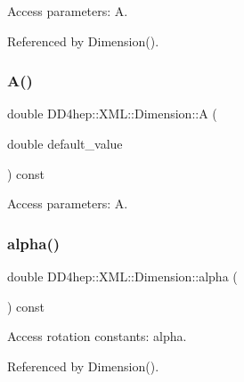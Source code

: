 Access parameters\+: A. 



Referenced by Dimension().

\hypertarget{struct_d_d4hep_1_1_x_m_l_1_1_dimension_a9117763ec12e9a29318293c24926f0f0}{}\label{struct_d_d4hep_1_1_x_m_l_1_1_dimension_a9117763ec12e9a29318293c24926f0f0} 
\subsubsection{\texorpdfstring{A()}{A()}\hspace{0.1cm}{\footnotesize\ttfamily [2/2]}}
{\footnotesize\ttfamily double D\+D4hep\+::\+X\+M\+L\+::\+Dimension\+::A (\begin{DoxyParamCaption}\item[{double}]{default\+\_\+value }\end{DoxyParamCaption}) const}



Access parameters\+: A. 

\hypertarget{struct_d_d4hep_1_1_x_m_l_1_1_dimension_aec3b76886a8f3a7040d96db3f43d0034}{}\label{struct_d_d4hep_1_1_x_m_l_1_1_dimension_aec3b76886a8f3a7040d96db3f43d0034} 
\subsubsection{\texorpdfstring{alpha()}{alpha()}\hspace{0.1cm}{\footnotesize\ttfamily [1/2]}}
{\footnotesize\ttfamily double D\+D4hep\+::\+X\+M\+L\+::\+Dimension\+::alpha (\begin{DoxyParamCaption}{ }\end{DoxyParamCaption}) const}



Access rotation constants\+: alpha. 



Referenced by Dimension().

\hypertarget{struct_d_d4hep_1_1_x_m_l_1_1_dimension_a5a98288a8792bff7733937ff26d65b4c}{}\label{struct_d_d4hep_1_1_x_m_l_1_1_dimension_a5a98288a8792bff7733937ff26d65b4c} 
